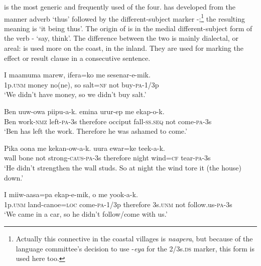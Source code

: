  is the most generic and frequently used of the four.  has developed from the manner adverb  `thus' followed by the different-subject marker -;\footnote{Actually this connective in the coastal villages is \textit{naapera}, but because of the language committee's decision to use -\textit{eya} for the 2/3s.\textsc{ds} marker, this form is used here too.} the resulting meaning is `it being thus'. The origin of  is in the medial different-subject form of the verb - `say, think'. The difference between the two is mainly dialectal, or areal:  is used more on the coast,  in the inland. They are used for marking the effect or result clause in a consecutive sentence. 

\ea%
\label{ex:3:x731}
\gll I maamuma marew,  ifera=ko me sesenar-e-mik. \\
1p.\textsc{unm} money no(ne), so salt=\textsc{nf} not buy-\textsc{pa}-1/3p\\
\glt`We didn't have money, so we didn't buy salt.'
\z

\ea%
\label{ex:3:x732}
\gll Ben uuw-owa piipu-a-k.  emina urur-ep me ekap-o-k.\\
Ben work-\textsc{nmz} left-\textsc{pa}-3s therefore occiput fall-\textsc{ss}.\textsc{seq} not come-\textsc{pa}-3s\\
\glt`Ben has left the work. Therefore he was ashamed to come.'
\z

\ea%
\label{ex:3:x735}
\gll Pika oona me kekan-ow-a-k.  uura ewar=ke teek-a-k.\\
wall bone not strong-\textsc{caus}-\textsc{pa}-3s therefore night wind=\textsc{cf} tear-\textsc{pa}-3s\\
\glt`He didn't strengthen the wall studs. So at night the wind tore it (the house) down.'
\z

\ea%
\label{ex:3:x1413}
\gll I miiw-aasa=pa ekap-e-mik,  o me yook-a-k.\\
1p.\textsc{unm} land-canoe=\textsc{loc} come-\textsc{pa}-1/3p therefore 3s.\textsc{unm} not follow.us-\textsc{pa}-3s\\
\glt`We came in a car, so he didn't follow/come with us.'
\z

